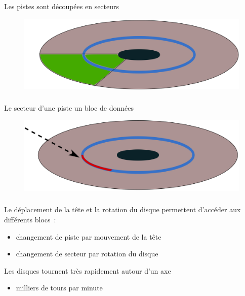 \begin{frame}
  \frametitle{\insertsubsection}
  Les pistes sont découpées en \alert{secteurs}
  \begin{figure}
    \includegraphics[width=0.8\linewidth]{fig3/secteur}
  \end{figure}
\end{frame}

\begin{frame}
  \frametitle{\insertsubsection}
  Le secteur d'une piste  un \alert{bloc de données}
  \begin{figure}
    \includegraphics[width=0.8\linewidth]{fig3/bloc}
  \end{figure}
\end{frame}

\begin{frame}
  \frametitle{\insertsubsection}
  Le déplacement de la tête et la rotation du disque permettent d'accéder aux
  différents blocs~:
  \vspace{0.5cm}
  \begin{itemize}
  \item[\ding{212}] changement de piste par \alert{mouvement} de la tête   
  \item[\ding{212}] changement de secteur par \alert{rotation} du disque
  \end{itemize}
  \vspace{0.5cm}

  Les disques tournent très rapidement autour d'un axe
  \begin{itemize}
  \item milliers de tours par minute
  \end{itemize}
\end{frame}

